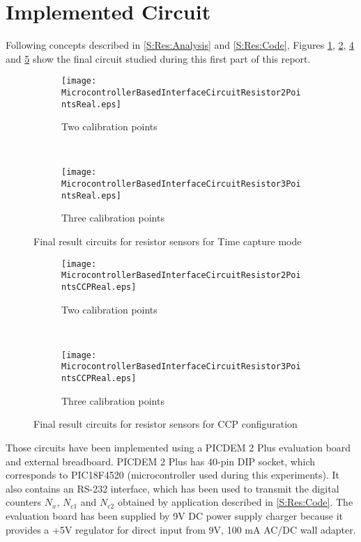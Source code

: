 \section{Implemented Circuit}\label{S:Res:Circuit}
Following concepts described in \ref{S:Res:Analysis} and \ref{S:Res:Code}, Figures \ref{fig:uR2PointsReal}, \ref{fig:uR3PointsReal}, \ref{fig:uR2PointsCCPReal} and \ref{fig:uR3PointsCCPReal} show the final circuit studied during this first part of this report.
\medskip

\begin{figure}[!ht]
\centering
	\begin{subfigure}{0.75\textwidth}
	\texttt{[image: MicrocontrollerBasedInterfaceCircuitResistor2PointsReal.eps]}
	\caption{Two calibration points}
	\label{fig:uR2PointsReal}
	\end{subfigure}
	~
	\begin{subfigure}{0.85\textwidth}
	\centering
	\texttt{[image: MicrocontrollerBasedInterfaceCircuitResistor3PointsReal.eps]}
	\caption{Three calibration points}
	\label{fig:uR3PointsReal}
	\end{subfigure}
\caption{Final result circuits for resistor sensors for Time capture mode}
\label{fig:FinalCircuits}
\end{figure}

\begin{figure}[!ht]
\centering
	\begin{subfigure}{0.75\textwidth}
	\centering
	\texttt{[image: MicrocontrollerBasedInterfaceCircuitResistor2PointsCCPReal.eps]}
	\caption{Two calibration points}
	\label{fig:uR2PointsCCPReal}
	\end{subfigure}
	~
	\begin{subfigure}{0.85\textwidth}
	\centering
	\texttt{[image: MicrocontrollerBasedInterfaceCircuitResistor3PointsCCPReal.eps]}
	\caption{Three calibration points}
	\label{fig:uR3PointsCCPReal}
	\end{subfigure}
\caption{Final result circuits for resistor sensors for CCP configuration}
\label{fig:FinalCircuitsCCP}
\end{figure}

Those circuits have been implemented using a PICDEM 2 Plus evaluation board and external breadboard. PICDEM 2 Plus has 40-pin DIP socket, which corresponds to PIC18F4520 (microcontroller used during this experiments). It also contains an RS-232 interface, which has been used to transmit the digital counters $N_{x}$, $N_{c1}$ and $N_{c2}$ obtained by application described in \ref{S:Res:Code}. The evaluation board has been supplied by 9V DC power supply charger because it provides a +5V regulator for direct input from 9V, 100 mA AC/DC wall adapter.
\medskip

